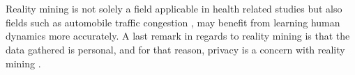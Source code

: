 \\\\
Reality mining is not solely a field applicable in health related studies but also fields such as automobile traffic congestion \parencite{pentland2009reality_mining_mobile_communication_gps}, may benefit from learning human dynamics more accurately. A last remark in regards to reality mining is that the data gathered is personal, and for that reason, privacy is a concern with reality mining \parencite{madan2009_reality_mining_privacy}.

